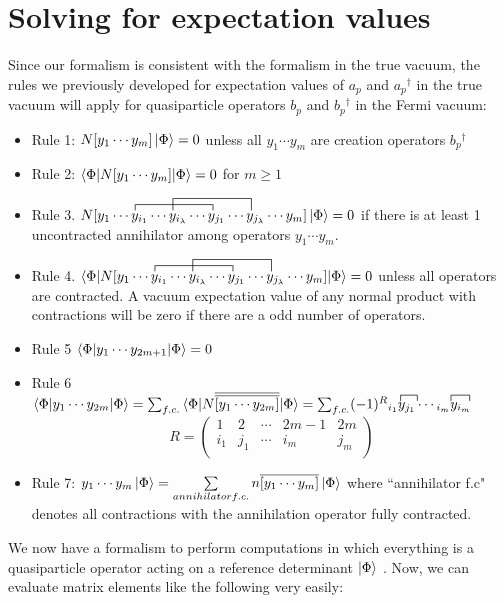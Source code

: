 \documentclass{article}
\newcommand{\ol}{\overline}
\newcommand{\fctr}{\contraction}
\newcommand{\kphi}{\ensuremath{\ket{\Phi}} }
\newcommand{\dg}{\ensuremath{^\dagger} }
\newcommand{\cd}{\ensuremath{\cdots} }
\begin{document}
\section{Solving for expectation values}
Since our formalism is consistent with the formalism in the true vacuum,
the rules we previously developed for expectation values of $a_p$ and $a_p\dg$ in the true vacuum
 will apply for quasiparticle operators $b_p$ and $b_p\dg$ in the Fermi vacuum: 
\begin{itemize}
\item Rule 1: $N[y_1 \cd y_m]\kphi = 0$ unless all $y_1 \cd y_m$ are creation operators $b_p\dg$\\
\item Rule 2: $\braket{\Phi | N[y_1 \cd y_m] | \Phi} = 0$ for  $m \geq 1$ \\
\item Rule 3. $\fctr{N[y_1 \cd }{y}{{}_{i_1} \cd y_{i_\lambda} \cd }{y}
\fctr[2ex]{N[y_1 \cd y_{i_1} \cd}{ y}{{}_{i_\lambda} \cd y_{j_1} \cd }{y} 
N[y_1 \cd y_{i_1} \cd y_{i_\lambda} \cd y_{j_1} \cd y_{j_\lambda} \cd y_m] \kphi= 0$ if there is at least 1 uncontracted annihilator among operators $y_1 \cd y_m$.  \\
\item Rule 4. $\braket{\Phi | \fctr{N[y_1 \cd }{y}{{}_{i_1} \cd y_{i_\lambda} \cd }{y}
\fctr[2ex]{N[y_1 \cd y_{i_1} \cd}{ y}{{}_{i_\lambda} \cd y_{j_1} \cd }{y} 
N[y_1 \cd y_{i_1} \cd y_{i_\lambda} \cd y_{j_1} \cd y_{j_\lambda} \cd y_m] |\Phi} = 0$ unless all operators are contracted.
A vacuum expectation value of any normal product with contractions will be zero if there are a odd number of operators. \\

\item Rule 5 $\braket{\Phi | y_1 \cd y_{2m + 1} | \Phi} = 0 $ \\

\item Rule 6 $\braket{\Phi | y_1 \cd y_{2m } | \Phi} = \sum_{f.c.} \braket{\Phi | N\ol{\ol{ [y_1 \cd y_{2m }]}}| \Phi} = \sum_{f.c.} (-1)^R \fctr{y}{{}_{i_1}}{y}  y_{i_1} y_{j_1} \cd \fctr{y}{{}_{i_m}}{y} y_{i_m} y_{i_m}$\\

\begin{equation*}
R = 
\begin{pmatrix}
1 & 2 &\cd  & 2m - 1 & 2m  \\
i_1 & j_1 & \cd  & i_m & j_m \\
\end{pmatrix}
\end{equation*}

\item Rule 7: $y_1 \cd y_m \kphi = \sum\limits_{annihilator f.c.} n\ol{[y_1 \cd y_m] }\ket{\Phi} $
where ``annihilator f.c" denotes all contractions with the annihilation operator fully contracted.
\end{itemize}
We now have a formalism to perform computations in which everything is a quasiparticle operator acting on a reference determinant \kphi. 
Now, we can evaluate matrix elements like the following very easily: 
\end{document}
